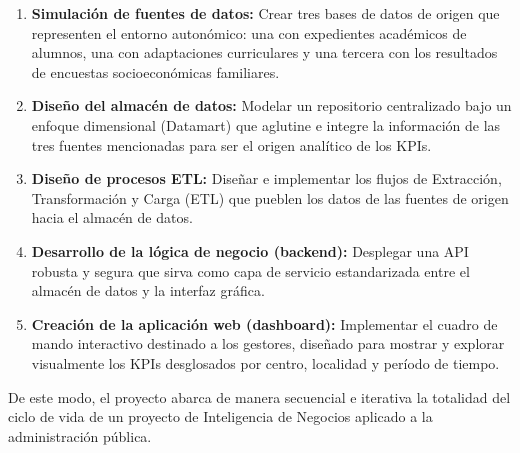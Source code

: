 \begin{enumerate}
    \item \textbf{Simulación de fuentes de datos:} Crear tres bases de datos de origen que representen el entorno autonómico: una con expedientes académicos de alumnos, una con adaptaciones curriculares y una tercera con los resultados de encuestas socioeconómicas familiares.
    \item \textbf{Diseño del almacén de datos:} Modelar un repositorio centralizado bajo un enfoque dimensional (Datamart) que aglutine e integre la información de las tres fuentes mencionadas para ser el origen analítico de los KPIs.
    \item \textbf{Diseño de procesos ETL:} Diseñar e implementar los flujos de Extracción, Transformación y Carga (ETL) que pueblen los datos de las fuentes de origen hacia el almacén de datos.
    \item \textbf{Desarrollo de la lógica de negocio (backend):} Desplegar una API robusta y segura que sirva como capa de servicio estandarizada entre el almacén de datos y la interfaz gráfica.
    \item \textbf{Creación de la aplicación web (dashboard):} Implementar el cuadro de mando interactivo destinado a los gestores, diseñado para mostrar y explorar visualmente los KPIs desglosados por centro, localidad y período de tiempo.
\end{enumerate}

De este modo, el proyecto abarca de manera secuencial e iterativa la totalidad del ciclo de vida de un proyecto de Inteligencia de Negocios aplicado a la administración pública.
